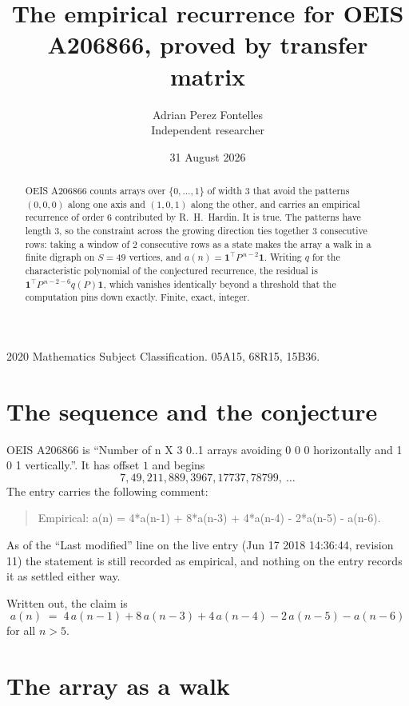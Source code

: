 \documentclass[11pt,a4paper]{article}
\title{The empirical recurrence for OEIS A206866, proved by transfer matrix}
\author{Adrian Perez Fontelles\\ \small Independent researcher}
\date{31 August 2026}
\theoremstyle{plain}
\theoremstyle{definition}
\begin{document}
\maketitle

\begin{abstract}
OEIS A206866 counts arrays over $\{0,\dots,1\}$ of width $3$ that avoid the patterns
$(0,0,0)$ along one axis and $(1,0,1)$ along the other, and carries an empirical recurrence of
order $6$ contributed by R.~H.~Hardin. It is true. The patterns have length $3$, so
the constraint across the growing direction ties together $3$ consecutive rows: taking a
window of $2$ consecutive rows as a state makes the array a walk in a finite digraph
on $S=49$ vertices, and $a(n)=\mathbf{1}^{\!\top}P^{\,n-2}\mathbf{1}$. Writing $q$
for the characteristic polynomial of the conjectured recurrence, the residual is
$\mathbf{1}^{\!\top}P^{\,n-2-6}q(P)\mathbf{1}$, which vanishes identically
beyond a threshold that the computation pins down exactly. Finite, exact, integer.
\end{abstract}

\noindent\small 2020 Mathematics Subject Classification. 05A15, 68R15, 15B36.\normalsize

\section{The sequence and the conjecture}

OEIS A206866 is ``Number of n X 3 0..1 arrays avoiding 0 0 0 horizontally and 1 0 1 vertically.''. It has offset
$1$ and begins
\[
7, 49, 211, 889, 3967, 17737, 78799,\ \dots
\]
The entry carries the following comment:
\begin{quote}\small
Empirical: a(n) = 4*a(n-1) + 8*a(n-3) + 4*a(n-4) - 2*a(n-5) - a(n-6).
\end{quote}
As of the ``Last modified'' line on the live entry (Jun 17 2018 14:36:44, revision
11) the statement is still recorded as empirical, and nothing on the entry
records it as settled either way.

Written out, the claim is
\begin{equation}\label{eq:conj}
a(n)\;=\;4\,a(n-1) + 8\,a(n-3) + 4\,a(n-4) - 2\,a(n-5) - a(n-6)
\end{equation}
for all $n>5$. 

\section{The array as a walk}
\end{document}
